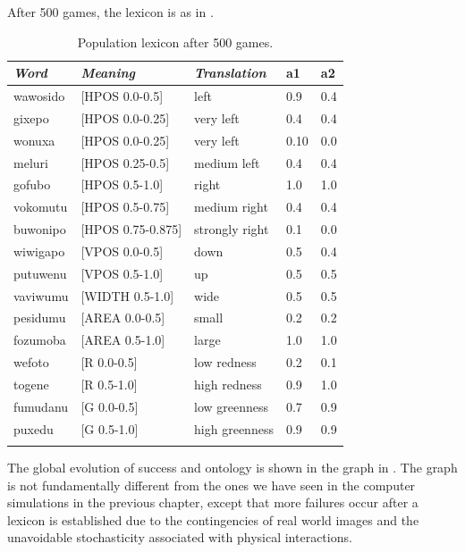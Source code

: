 After 500 games, the lexicon is as in . 
\begin{table}
\begin{center}
\begin{tabular}{ l  l  l  l  l }
\lsptoprule
{\it Word}&{\it Meaning}&{\it Translation} & {\bf a1}&{\bf a2} \\ \midrule
wawosido & [HPOS 0.0-0.5] &left&0.9&0.4\\ \midrule
gixepo & [HPOS 0.0-0.25] & very left&0.4&0.4\\ \midrule
wonuxa & [HPOS 0.0-0.25] & very left&0.10&0.0\\ \midrule
meluri & [HPOS 0.25-0.5] &medium left&0.4&0.4\\ \midrule
gofubo & [HPOS 0.5-1.0]& right&1.0&1.0\\ \midrule
vokomutu & [HPOS 0.5-0.75] &medium right&0.4&0.4\\ \midrule
buwonipo & [HPOS 0.75-0.875] &strongly right&0.1&0.0\\ \midrule
wiwigapo & [VPOS 0.0-0.5] &down&0.5&0.4\\ \midrule
putuwenu & [VPOS 0.5-1.0]&up & 0.5&0.5\\ \midrule
vaviwumu & [WIDTH 0.5-1.0]&wide & 0.5&0.5\\ \midrule
pesidumu & [AREA 0.0-0.5]&small& 0.2&0.2\\ \midrule
fozumoba & [AREA 0.5-1.0]&large & 1.0&1.0\\ \midrule
wefoto & [R 0.0-0.5]& low redness &0.2&0.1\\ \midrule
togene & [R 0.5-1.0]& high redness &0.9&1.0\\ \midrule
fumudanu & [G 0.0-0.5]& low greenness &0.7&0.9\\ \midrule
puxedu & [G 0.5-1.0]& high greenness &0.9&0.9\\ \midrule
\lspbottomrule
\end{tabular}
\caption{ \label{tab:puxedu} Population lexicon after 500 games.}
\end{center}
\end{table}
The global evolution of success and ontology is shown in the 
graph in . The graph is not 
fundamentally different from the ones we have
seen in the computer simulations in the previous
chapter, except that more failures occur after a lexicon
is established due to the contingencies of real 
world images and the unavoidable stochasticity 
associated with physical interactions. 
